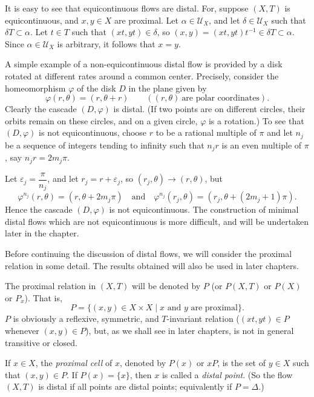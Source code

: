 It is easy to see that equicontinuous flows are distal. For, suppose $(X, T)$ is equicontinuous, and $x, y \in X$ are proximal. Let $\alpha \in \mathcal{U}_X$, and let $\delta \in \mathcal{U}_X$ such that $\delta T \subset \alpha$. Let $t \in T$ such that $(xt, yt) \in \delta$, so $(x, y) = (xt, yt)t^{-1} \in \delta T \subset \alpha$. Since $\alpha \in \mathcal{U}_X$ is arbitrary, it follows that $x = y$.



A simple example of a non-equicontinuous distal flow is provided by a
disk rotated at different rates around a common center. Precisely,
consider the homeomorphism $\varphi$ of the disk $D$ in the plane given by
\[
    \varphi(r,\theta) = (r,\theta + r)\qquad ((r,\theta)\ \text{are polar coordinates}).
\]
Clearly the cascade $(D,\varphi)$ is distal. (If two points are on different
circles, their orbits remain on these circles, and on a given circle,
$\varphi$ is a rotation.) To see that $(D,\varphi)$ is not equicontinuous,
choose $r$ to be a rational multiple of $\pi$ and let $n_j$ be a sequence of
integers tending to infinity such that $n_j r$ is an even multiple of $\pi$,
say $n_j r = 2m_j \pi$.

Let $\varepsilon_j = \dfrac{\pi}{n_j}$, and let $r_j = r + \varepsilon_j$, so
$(r_j,\theta) \to (r,\theta)$, but
\[
    \varphi^{n_j}(r,\theta) = (r,\theta + 2m_j \pi)
    \quad\text{and}\quad
    \varphi^{n_j}(r_j,\theta) = (r_j,\theta + (2m_j+1)\pi).
\]
Hence the cascade $(D,\varphi)$ is not equicontinuous. The construction of
minimal distal flows which are not equicontinuous is more difficult, and
will be undertaken later in the chapter.

Before continuing the discussion of distal flows, we will consider the
proximal relation in some detail. The results obtained will also be used
in later chapters.

The proximal relation in $(X,T)$ will be denoted by $P$ (or $P(X,T)$
or $P(X)$ or $P_x$). That is,
\[
    P=\{(x,y)\in X\times X \mid x \text{ and } y \text{ are proximal}\}.
\]
$P$ is obviously a reflexive, symmetric, and $T$-invariant relation
($(xt,yt)\in P$ whenever $(x,y)\in P$), but, as we shall see in later
chapters, is not in general transitive or closed.

If $x\in X$, the \emph{proximal cell} of $x$, denoted by $P(x)$ or $xP$, is the
set of $y\in X$ such that $(x,y)\in P$. If $P(x)=\{x\}$, then $x$ is called
a \emph{distal point}. (So the flow $(X,T)$ is distal if all points are distal
points; equivalently if $P=\Delta$.)




